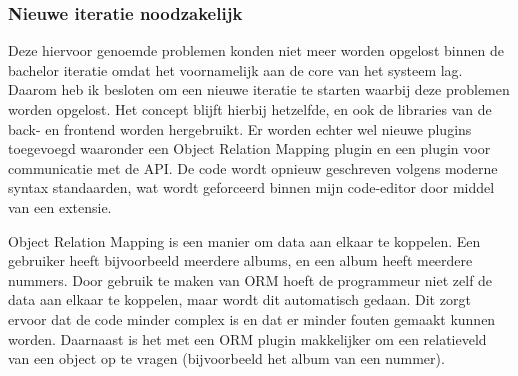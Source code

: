 \subsubsection*{Nieuwe iteratie noodzakelijk}
Deze hiervoor genoemde problemen konden niet meer worden opgelost binnen de bachelor iteratie omdat het voornamelijk aan de core van het systeem lag. Daarom heb ik besloten om een nieuwe iteratie te starten waarbij deze problemen worden opgelost. Het concept blijft hierbij hetzelfde, en ook de libraries van de back- en frontend worden hergebruikt. Er worden echter wel nieuwe plugins toegevoegd waaronder een Object Relation Mapping plugin en een plugin voor communicatie met de API. De code wordt opnieuw geschreven volgens moderne syntax standaarden, wat wordt geforceerd binnen mijn code-editor door middel van een extensie.

Object Relation Mapping is een manier om data aan elkaar te koppelen. Een gebruiker heeft bijvoorbeeld meerdere albums, en een album heeft meerdere nummers. Door gebruik te maken van ORM hoeft de programmeur niet zelf de data aan elkaar te koppelen, maar wordt dit automatisch gedaan. Dit zorgt ervoor dat de code minder complex is en dat er minder fouten gemaakt kunnen worden. Daarnaast is het met een ORM plugin makkelijker om een relatieveld van een object op te vragen (bijvoorbeeld het album van een nummer).
